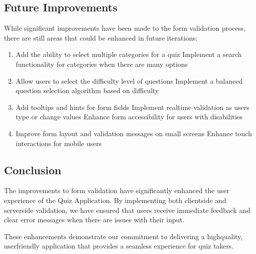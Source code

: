 \documentclass[letterpaper,10pt,english]{sphinxmanual}
\begin{document}
\subsection{Future Improvements}
\label{\detokenize{improvements:future-improvements}}
\sphinxAtStartPar
While significant improvements have been made to the form validation process, there are still areas that could be enhanced in future iterations:
\begin{enumerate}
%
\item {} 
\sphinxAtStartPar
{}
\sphinxhyphen{} Add the ability to select multiple categories for a quiz
\sphinxhyphen{} Implement a search functionality for categories when there are many options

\item {} 
\sphinxAtStartPar
{}
\sphinxhyphen{} Allow users to select the difficulty level of questions
\sphinxhyphen{} Implement a balanced question selection algorithm based on difficulty

\item {} 
\sphinxAtStartPar
{}
\sphinxhyphen{} Add tooltips and hints for form fields
\sphinxhyphen{} Implement real\sphinxhyphen{}time validation as users type or change values
\sphinxhyphen{} Enhance form accessibility for users with disabilities

\item {} 
\sphinxAtStartPar
{}
\sphinxhyphen{} Improve form layout and validation messages on small screens
\sphinxhyphen{} Enhance touch interactions for mobile users

\end{enumerate}


\subsection{Conclusion}
\label{\detokenize{improvements:conclusion}}
\sphinxAtStartPar
The improvements to form validation have significantly enhanced the user experience of the Quiz Application.
By implementing both client\sphinxhyphen{}side and server\sphinxhyphen{}side validation, we have ensured that users receive immediate
feedback and clear error messages when there are issues with their input.

\sphinxAtStartPar
These enhancements demonstrate our commitment to delivering a high\sphinxhyphen{}quality, user\sphinxhyphen{}friendly application
that provides a seamless experience for quiz takers.
\end{document}
